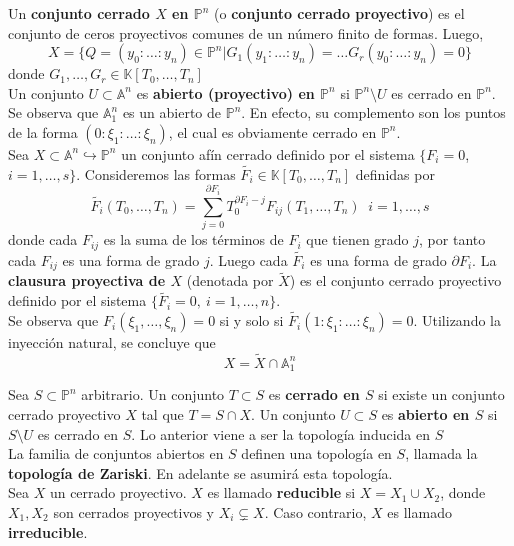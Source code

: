 \documentclass[12pt,a4paper]{report}
\newcommand{\ea}{\mathbb{A}^{n}}
\newcommand{\ep}{\mathbb{P}^{n}}
\newcommand{\K}{\mathbb{K}}
\begin{document}
Un \textbf{conjunto cerrado $X$ en $\ep $} (o \textbf{conjunto cerrado proyectivo}) es el conjunto de ceros proyectivos comunes de un número finito de formas. Luego, 
$$ X= \{ Q=(y_{0}:\ldots : y_{n}) \in \ep | G_{1}(y_{1}:\ldots : y_{n})= \ldots G_{r} (y_{0} : \ldots : y_{n}) =0 \} $$
donde $ G_{1}, \ldots , G_{r} \in \K [ T_{0}, \ldots , T_{n} ] $\\
Un conjunto $U \subset \ea $ es \textbf{abierto (proyectivo) en $\ep$} si $\ep \setminus U$ es cerrado en $\ep$.\\
Se observa que $\ea_{1}$ es un abierto de $\ep$. En efecto, su complemento son los puntos de la forma $(0 : \xi_{1} : \ldots : \xi_{n})$, el cual es obviamente cerrado en $\ep$. \\


Sea $X \subset \ea \hookrightarrow \ep$ un conjunto afín cerrado definido por el sistema $\{F_{i} = 0$, $i=1, \ldots ,s \}$. Consideremos las formas $\tilde{F_{i}}\in \K [ T_{0}, \ldots , T_{n} ] $ definidas por 
$$ \tilde{F_{i}} (T_{0},\ldots , T_{n}) =  \sum_{j=0}^{\partial F_{i}} T_{0}^{\partial F_{i}-j}F_{ij} (T_{1},\ldots , T_{n}) \; \; i=1, \ldots , s$$ 
donde cada $F_{ij}$ es la suma de los términos de $F_{i}$ que tienen grado $j$, por tanto cada $F_{ij}$ es una forma de grado $j$. Luego cada $\tilde{F_{i}}$ es una forma de grado $\partial F_{i}$. La \textbf{clausura proyectiva de $X$} (denotada por $\widetilde{X}$) es el conjunto cerrado proyectivo definido por el sistema $\{\widetilde{F_{i}}=0, \ i =1, \ldots, n\}$.\\
Se observa que $F_{i}(\xi_{1}, \ldots, \xi_{n})=0 $ si y solo si $\tilde{F_{i}}(1:\xi_{1} : \ldots : \xi_{n} ) =0 $. Utilizando la inyección natural, se concluye que \begin{equation} \label{eq1}
X = \tilde{X} \cap \ea_{1}
\end{equation}

Sea $S \subset \ep$ arbitrario. Un conjunto $T\subset S$ es \textbf{cerrado en $S$} si existe un conjunto cerrado proyectivo $X$ tal que $T=S \cap X$. Un conjunto $U \subset S$ es \textbf{abierto en $S$} si $S\setminus U$ es cerrado en $S$. Lo anterior viene a ser la topología inducida en $S$\\
La familia de conjuntos abiertos en $S$ definen una topología en $S$, llamada la \textbf{topología de Zariski}. En adelante se asumirá esta topología.\\

Sea $X$ un cerrado proyectivo. $X$ es llamado \textbf{reducible} si $X=X_{1} \cup X_{2}$, donde $X_{1}, X_{2}$ son cerrados proyectivos y $X_{i}\subsetneq X$. Caso contrario, $X$ es llamado \textbf{irreducible}.\\
\end{document}
